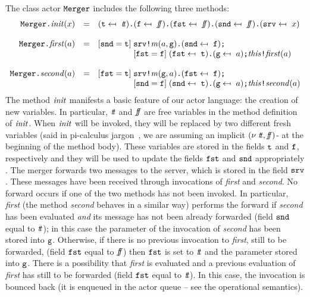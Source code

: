 \documentclass{LMCS}
\theoremstyle{plain}\newtheorem{proposition}[thm]{Proposition}
\theoremstyle{plain}\newtheorem{lemma}[thm]{Lemma}
\theoremstyle{plain}\newtheorem{theorem}[thm]{Theorem}
\theoremstyle{plain}\newtheorem{corollary}[thm]{Corollary}
\newcommand{\invk}{\mbox{\tt !}}
\newcommand{\prefix}{\mbox{\tt .}}
\newcommand{\ite}{\mbox{{\tt ;}}}
\newcommand{\false}{{\it f\hspace{-3pt}f}}
\newcommand{\true}{{\it t\hspace{-2.3pt}t}}
\newcommand{\upd}{\mapsfrom~}
\newcommand{\adef}[1]{{\tt #1}}
\begin{document}
\begin{exa}
The class actor ${\adef{Merger}}$ 
includes the following three methods:
{\small
\[
\begin{array}{rll}
\adef{Merger} \prefix 
{\it init}(x) & = &
({\tt t} \upd \true) \prefix 
({\tt f} \upd \false) \prefix 
({\tt fst} \upd \false) \prefix
({\tt snd} \upd \false) \prefix
({\tt srv} \upd x)
\\
\\
\adef{Merger} \prefix 
{\it first}(a) & = &
[{\tt snd} = {\tt t}] \; {\tt srv} \invk {\it m}(a,{\tt g}) \prefix
 ({\tt snd} \upd {\tt f}) \ite 
 \\
 && \qquad \qquad 
\; [{\tt fst} = {\tt f}] \; ({\tt fst} \upd {\tt t}) \prefix 
 ({\tt g} \upd a) \ite {\it this} \invk {\it first}(a)
\\
\\
\adef{Merger} \prefix 
{\it second}(a) & = &
[{\tt fst} = {\tt t}] \; {\tt srv} \invk {\it m}({\tt g},a) \prefix
 ({\tt fst} \upd {\tt f}) \ite 
\\
&& \qquad \qquad 
\; [{\tt snd} = {\tt f}] \; ({\tt snd} \upd {\tt t}) \prefix 
 ({\tt g} \upd a) \ite {\it this} \invk {\it second}(a)
\end{array} 
\]
}The method ${\it init}$ manifests a basic feature of our actor language: 
the creation of new variables. In particular, $\true$ and $\false$ are free
variables in the method definition of ${\it init}$. When ${\it init}$ will be invoked, they 
will be replaced by two different fresh variables
(said in pi-calculus jargon~\cite{PIC}, we are 
assuming an implicit $(\nu \; \true,\false)$- at the beginning of the method body). These 
variables are stored in the fields ${\tt t}$ and ${\tt f}$, respectively and they 
will be used to 
update the fields ${\tt fst}$ and ${\tt snd}$ appropriately
.
The merger forwards two messages to the server, which is stored in the field 
${\tt srv}$. These messages have been received through invocations of {\it first} and {\it second}.
No forward occurs if one of the two methods has not been invoked. In particular,
{\it first} (the method {\it second} behaves in a similar way) performs the
forward if {\it second} has been evaluated \emph{and} its message has not
been already forwarded  (field ${\tt snd}$ equal to $\true$); in this case
the parameter of the invocation of {\it second} has been stored into ${\tt g}$. Otherwise, if there is no
previous invocation to {\it first}, still to be forwarded, (field ${\tt fst}$ equal 
to $\false$) then ${\tt fst}$ is set to $\true$ and the parameter stored into ${\tt g}$.
There is a possibility that {\it first} is evaluated and a previous evaluation 
of {\it first} has still to be forwarded (field ${\tt fst}$ equal 
to $\true$). In this case,  the invocation is bounced back (it is enqueued in the 
actor queue -- see the operational semantics). 
  



\end{exa}
\fi
\end{document}
